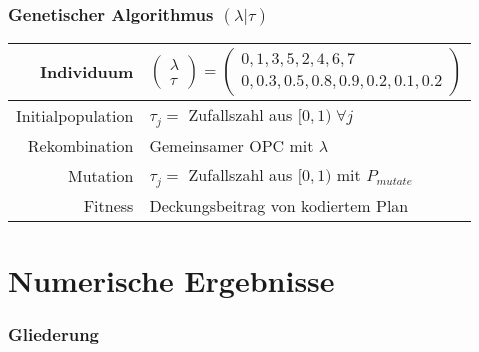 \begin{frame}
	\frametitle{Genetischer Algorithmus $(\lambda|\tau)$}
	\begin{small}
		\begin{center}
			\begin{tabular}{rl}
				\hline 
				Individuum & $\begin{pmatrix}\lambda\\\tau\end{pmatrix}=\begin{pmatrix}0,1,3,5,2,4,6,7\\0,0.3,0.5,0.8,0.9,0.2,0.1,0.2\end{pmatrix}$\parbox[c][40pt][c]{0pt}{}\tabularnewline
				\hline 
				Initialpopulation & $\tau_j=$ Zufallszahl aus $[0, 1) \; \forall j$\tabularnewline
				\hline 
				Rekombination & Gemeinsamer OPC mit $\lambda$\tabularnewline
				\hline 
				Mutation & $\tau_j=$ Zufallszahl aus $[0,1)$ mit $P_{mutate}$\tabularnewline
				\hline 
				Fitness & Deckungsbeitrag von kodiertem Plan\tabularnewline
				\hline 
			\end{tabular}
		\end{center}
	\end{small}
\end{frame}


\section{Numerische Ergebnisse}
\begin{frame}[noframenumbering]
\frametitle{Gliederung}
\end{frame}


